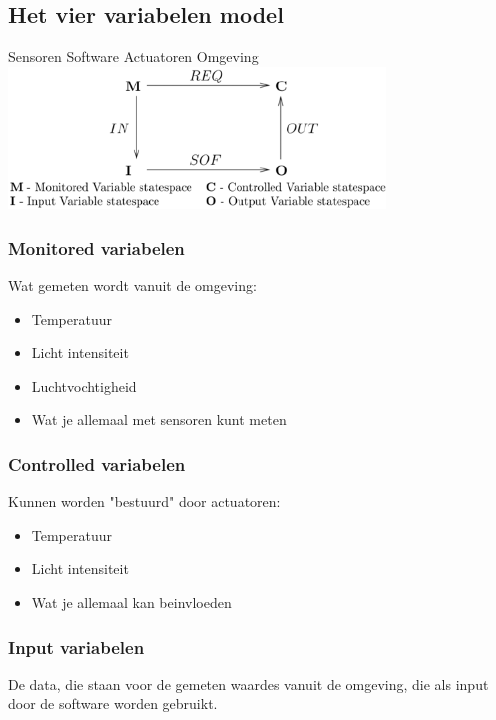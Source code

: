 \documentclass{article}%
\begin{document}
\subsection{Het vier variabelen model}
Sensoren Software Actuatoren Omgeving
\\
\includegraphics[width=10cm]{pictures/4_var_model.png}
\\
\cite{https://www.researchgate.net/figure/4-Variable-Model-of-Parnas-Madey_fig3_270733268}

\subsubsection{Monitored variabelen}
Wat gemeten wordt vanuit de omgeving:
\begin{itemize}
  \item Temperatuur
  \item Licht intensiteit
  \item Luchtvochtigheid
  \item Wat je allemaal met sensoren kunt meten
\end{itemize}

\subsubsection{Controlled variabelen}
Kunnen worden "bestuurd" door actuatoren:
\begin{itemize}
  \item Temperatuur
  \item Licht intensiteit
  \item Wat je allemaal kan beinvloeden
\end{itemize}

\subsubsection{Input variabelen}
De data, die staan voor de gemeten waardes vanuit de omgeving, die als input door de software worden gebruikt.
\end{document}
